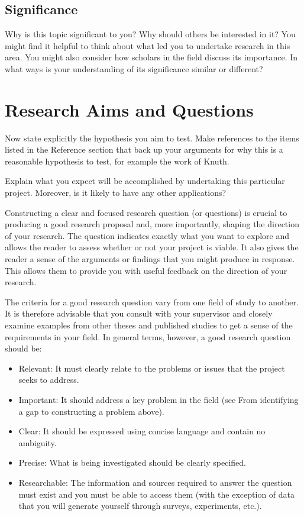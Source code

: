 \documentclass[12pt, a4paper]{article}
\begin{document}
\subsection{Significance}
Why is this topic significant to you? Why should others be interested in it? You might find it helpful to think about what led you to undertake research in this area. You might also consider how scholars in the field discuss its importance. In what ways is your understanding of its significance similar or different?


\section{Research Aims and Questions}
Now state explicitly the hypothesis you aim to test. Make references to the items listed in the Reference section that back up your arguments for why this is a reasonable hypothesis to test, for example the work of Knuth.

Explain what you expect will be accomplished by undertaking this particular project.  Moreover, is it likely to have any other applications?

Constructing a clear and focused research question (or questions) is crucial to producing a good research proposal and, more importantly, shaping the direction of your research. The question indicates exactly what you want to explore and allows the reader to assess whether or not your project is viable. It also gives the reader a sense of the arguments or findings that you might produce in response. This allows them to provide you with useful feedback on the direction of your research.

The criteria for a good research question vary from one field of study to another. It is therefore advisable that you consult with your supervisor and closely examine examples from other theses and published studies to get a sense of the requirements in your field. In general terms, however, a good research question should be:
\begin{itemize}
\item Relevant: It must clearly relate to the problems or issues that the project seeks to address.
\item Important: It should address a key problem in the field (see From identifying a gap to constructing a problem above).  
\item Clear: It should be expressed using concise language and contain no ambiguity.
\item Precise: What is being investigated should be clearly specified.
\item Researchable: The information and sources required to answer the question must exist and you must be able to access them (with the exception of data that you will generate yourself through surveys, experiments, etc.).
\end{itemize}
\end{document}
